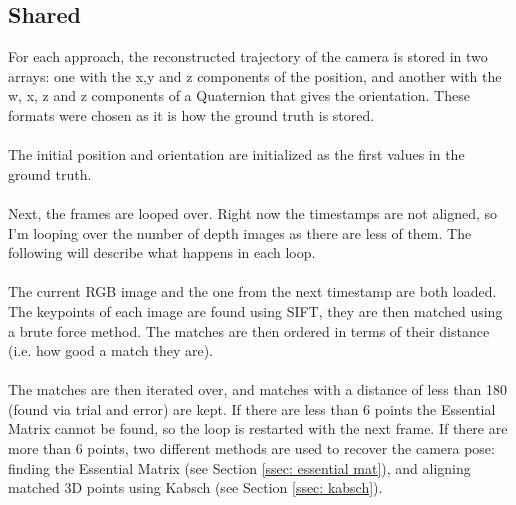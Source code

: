 \documentclass[12pt,a4paper]{article}
\begin{document}
\subsection{Shared}
For each approach, the reconstructed trajectory of the camera is stored in two arrays: one with the x,y and z components of the position, and another with the w, x, z and z components of a Quaternion that gives the orientation. These formats were chosen as it is how the ground truth is stored.
\\\\
The initial position and orientation are initialized as the first values in the ground truth.
\\\\
Next, the frames are looped over. Right now the timestamps are not aligned, so I'm looping over the number of depth images as there are less of them. The following will describe what happens in each loop.
\\\\
The current RGB image and the one from the next timestamp are both loaded. The keypoints of each image are found using SIFT, they are then matched using a brute force method. The matches are then ordered in terms of their distance (i.e. how good a match they are). 
\\\\
The matches are then iterated over, and matches with a distance of less than 180 (found via trial and error) are kept. If there are less than 6 points the Essential Matrix cannot be found, so the loop is restarted with the next frame. If there are more than 6 points, two different methods are used to recover the camera pose: finding the Essential Matrix (see Section \ref{ssec: essential mat}), and aligning matched 3D points using Kabsch (see Section \ref{ssec: kabsch}).
\end{document}
